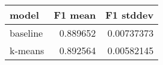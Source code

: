 \begin{tabular}{lrr}
\toprule
 model    &   F1 mean &   F1 stddev \\
\midrule
 baseline &  0.889652 &  0.00737373 \\
 k-means  &  0.892564 &  0.00582145 \\
\bottomrule
\end{tabular}